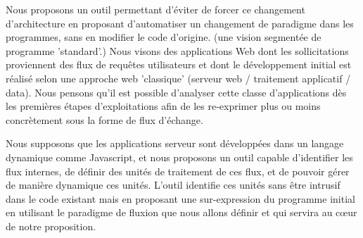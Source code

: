 Nous proposons un outil permettant d'éviter de forcer ce changement d'architecture en proposant d'automatiser un changement de paradigme dans les programmes, sans en modifier le code d'origine.
(une vision segmentée de programme 'standard'.)
Nous visons des applications Web dont les sollicitations proviennent des flux de requêtes utilisateurs et dont le développement initial est réalisé selon une approche web 'classique' (serveur web / traitement applicatif / data).
Nous pensons qu'il est possible d'analyser cette classe d'applications dès les premières étapes d'exploitations afin de les re-exprimer plus ou moins concrètement sous la forme de flux d'échange.

Nous supposons que les applications serveur sont développées dans un langage dynamique comme Javascript, et nous proposons un outil capable d'identifier les flux internes, de définir des unités de traitement de ces flux, et de pouvoir gérer de manière dynamique ces unités.
L'outil identifie ces unités sans être intrusif dans le code existant mais en proposant une sur-expression du programme initial en utilisant le paradigme de fluxion que nous allons définir et qui servira au cœur de notre proposition.

